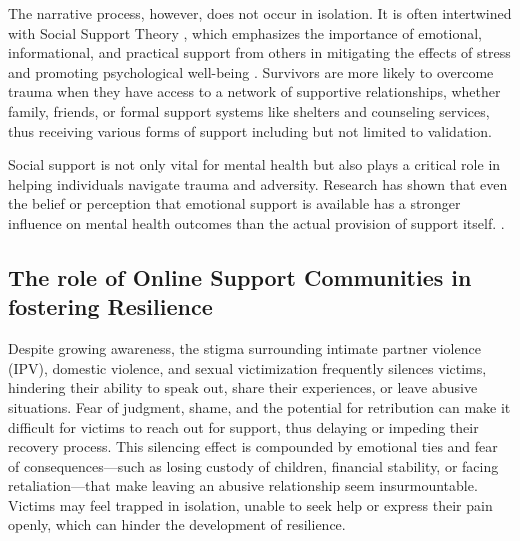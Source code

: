 \documentclass[11pt]{article}
\begin{document}
The narrative process, however, does not occur in isolation. 
It is often intertwined with Social Support Theory \citep{vaux1988social, house1987social}, which emphasizes the importance of emotional, informational, and practical support from others in mitigating the effects of stress and promoting psychological well-being \citep{cohen1985stress}. 
Survivors are more likely to overcome trauma when they have access to a network of supportive relationships, whether family, friends, or formal support systems like shelters and counseling services, thus receiving various forms of support including but not limited to validation.

Social support is not only vital for mental health but also plays a critical role in helping individuals navigate trauma and adversity. 
Research has shown that even the belief or perception that emotional support is available has a stronger influence on mental health outcomes than the actual provision of support itself. \citep{dunkel1990determinants, wethington1986perceived}.  

\subsection{The role of Online Support Communities in fostering Resilience}

Despite growing awareness, the stigma surrounding intimate partner violence (IPV), domestic violence, and sexual victimization frequently silences victims, hindering their ability to speak out, share their experiences, or leave abusive situations.
Fear of judgment, shame, and the potential for retribution can make it difficult for victims to reach out for support, thus delaying or impeding their recovery process. 
This silencing effect is compounded by emotional ties and fear of consequences—such as losing custody of children, financial stability, or facing retaliation—that make leaving an abusive relationship seem insurmountable. 
Victims may feel trapped in isolation, unable to seek help or express their pain openly, which can hinder the development of resilience.
\end{document}
